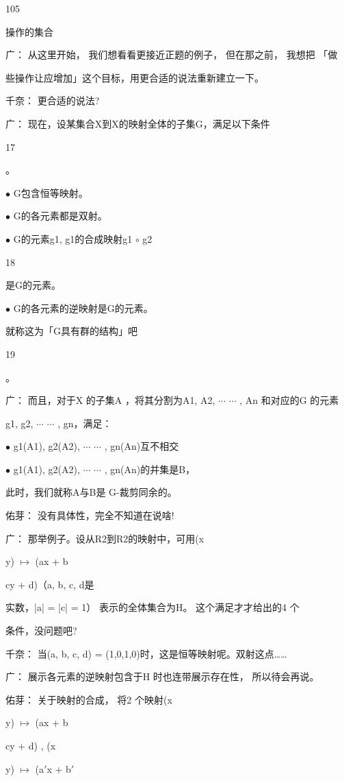 105\par
操作的集合\par
广： 从这里开始， 我们想看看更接近正题的例子， 但在那之前， 我想把 「做\par
些操作让应增加」这个目标，用更合适的说法重新建立一下。\par
千奈： 更合适的说法?\par
广： 现在，设某集合X到X的映射全体的子集G，满足以下条件\par
17\par
。\par
$\bullet$ G包含恒等映射。\par
$\bullet$ G的各元素都是双射。\par
$\bullet$ G的元素g1, g1的合成映射g1 $\circ$ g2\par
18\par
是G的元素。\par
$\bullet$ G的各元素的逆映射是G的元素。\par
就称这为「G具有群的结构」吧\par
19\par
。\par
广： 而且，对于X 的子集A ，将其分割为A1, A2, $\cdots$ $\cdots$ , An 和对应的G 的元素\par
g1, g2, $\cdots$ $\cdots$ , gn，满足：\par
$\bullet$ g1(A1), g2(A2), $\cdots$ $\cdots$ , gn(An)互不相交\par
$\bullet$ g1(A1), g2(A2), $\cdots$ $\cdots$ , gn(An)的并集是B，\par
此时，我们就称A与B是 G-裁剪同余的。\par
佑芽： 没有具体性，完全不知道在说啥!\par
广： 那举例子。设从R2到R2的映射中，可用(x\par
y) $\mapsto$ (ax + b\par
cy + d)（a, b, c, d是\par
实数，|a| = |c| = 1） 表示的全体集合为H。 这个满足才才给出的4 个\par
条件，没问题吧?\par
千奈： 当(a, b, c, d) = (1,0,1,0)时，这是恒等映射呢。双射这点……\par
广： 展示各元素的逆映射包含于H 时也连带展示存在性， 所以待会再说。\par
佑芽： 关于映射的合成， 将2 个映射(x\par
y) $\mapsto$ (ax + b\par
cy + d) , (x\par
y) $\mapsto$ (a$\prime$x + b$\prime$\par
